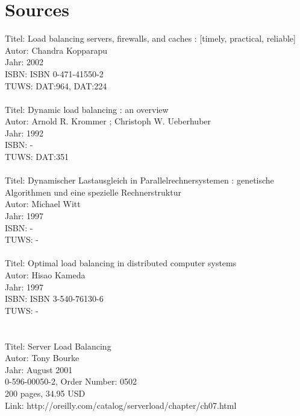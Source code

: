 \documentclass[12p]{article}
\begin{document}
	\section{Sources}
	Titel:    Load balancing servers, firewalls, and caches : [timely, practical, reliable]\\
	Autor:    Chandra Kopparapu\\
	Jahr:    2002\\
	ISBN:    ISBN 0-471-41550-2\\
	TUWS:    DAT:964, DAT:224\\
	\\
	Titel:    Dynamic load balancing : an overview\\
	Autor:    Arnold R. Krommer ; Christoph W. Ueberhuber\\
	Jahr:    1992\\
	ISBN:     -\\
	TUWS:    DAT:351\\
	\\
	Titel:    Dynamischer Lastausgleich in Parallelrechnersystemen : genetische Algorithmen und eine spezielle Rechnerstruktur\\
	Autor:    Michael Witt\\
	Jahr:    1997\\
	ISBN:    -\\
	TUWS:    -\\
	\\
	Titel:    Optimal load balancing in distributed computer systems\\
	Autor:    Hisao Kameda\\
	Jahr:    1997\\
	ISBN:    ISBN 3-540-76130-6\\
	TUWS:     -\\
	\\
	\\
	Titel:     Server Load Balancing\\
	Autor:     Tony Bourke\\
	Jahr:     August 2001\\
	0-596-00050-2, Order Number: 0502\\
	200 pages, 34.95 USD\\
	Link: http://oreilly.com/catalog/serverload/chapter/ch07.html\\
	\\
	\\
\end{document}
